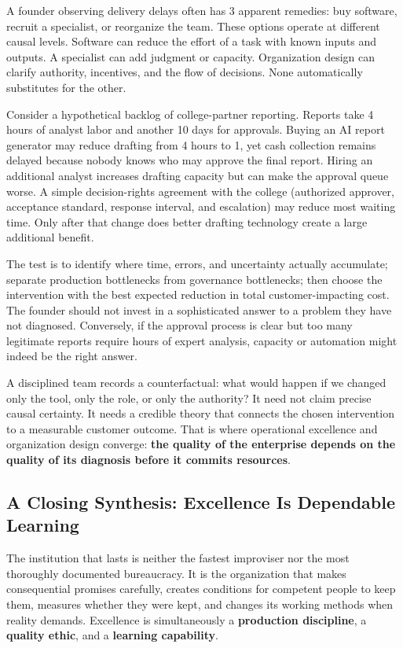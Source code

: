 A founder observing delivery delays often has 3 apparent remedies: buy software, recruit a specialist, or reorganize the team. These options operate at different causal levels. Software can reduce the effort of a task with known inputs and outputs. A specialist can add judgment or capacity. Organization design can clarify authority, incentives, and the flow of decisions. None automatically substitutes for the other.

Consider a hypothetical backlog of college-partner reporting. Reports take 4 hours of analyst labor and another 10 days for approvals. Buying an AI report generator may reduce drafting from 4 hours to 1, yet cash collection remains delayed because nobody knows who may approve the final report. Hiring an additional analyst increases drafting capacity but can make the approval queue worse. A simple decision-rights agreement with the college (authorized approver, acceptance standard, response interval, and escalation) may reduce most waiting time. Only after that change does better drafting technology create a large additional benefit.

The test is to identify where time, errors, and uncertainty actually accumulate; separate production bottlenecks from governance bottlenecks; then choose the intervention with the best expected reduction in total customer-impacting cost. The founder should not invest in a sophisticated answer to a problem they have not diagnosed. Conversely, if the approval process is clear but too many legitimate reports require hours of expert analysis, capacity or automation might indeed be the right answer.

A disciplined team records a counterfactual: what would happen if we changed only the tool, only the role, or only the authority? It need not claim precise causal certainty. It needs a credible theory that connects the chosen intervention to a measurable customer outcome. That is where operational excellence and organization design converge: \textbf{the quality of the enterprise depends on the quality of its diagnosis before it commits resources}.

\subsection{A Closing Synthesis: Excellence Is Dependable Learning}
\label{sec:closing_synthesis_excellence}

The institution that lasts is neither the fastest improviser nor the most thoroughly documented bureaucracy. It is the organization that makes consequential promises carefully, creates conditions for competent people to keep them, measures whether they were kept, and changes its working methods when reality demands. Excellence is simultaneously a \textbf{production discipline}, a \textbf{quality ethic}, and a \textbf{learning capability}.

